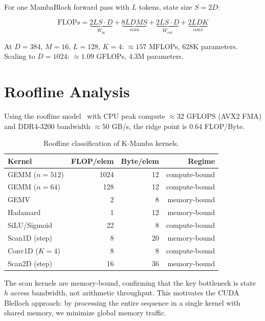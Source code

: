 \documentclass[10pt,twocolumn]{article}
\begin{document}
For one MambaBlock forward pass with $L$ tokens, state size $S = 2D$:

\begin{equation}
  \text{FLOPs} = \underbrace{2LS \cdot D}_{W_\text{in}}
               + \underbrace{8LDMS}_{scan}
               + \underbrace{2LS \cdot D}_{W_\text{out}}
               + \underbrace{2LDK}_{conv}
\end{equation}

At $D = 384$, $M = 16$, $L = 128$, $K = 4$: $\approx 157$ MFLOPs,
628K parameters. Scaling to $D = 1024$: $\approx 1.09$ GFLOPs, 4.3M parameters.

\section{Roofline Analysis}
\label{sec:roofline}

Using the roofline model~\cite{williams2009roofline} with
CPU peak compute $\approx 32$ GFLOPS (AVX2 FMA) and
DDR4-3200 bandwidth $\approx 50$ GB/s,
the ridge point is $0.64$ FLOP/Byte.

\begin{table}[h]
\centering
\caption{Roofline classification of K-Mamba kernels.}
\label{tab:roofline}
\begin{tabular}{lrrr}
\toprule
Kernel & FLOP/elem & Byte/elem & Regime \\
\midrule
GEMM ($n{=}512$) & 1024 & 12 & compute-bound \\
GEMM ($n{=}64$)  & 128  & 12 & compute-bound \\
GEMV             & 2    & 8  & memory-bound \\
Hadamard         & 1    & 12 & memory-bound \\
SiLU/Sigmoid     & 22   & 8  & compute-bound \\
Scan1D (step)    & 8    & 20 & memory-bound \\
Conv1D ($K{=}4$) & 8    & 8  & compute-bound \\
Scan2D (step)    & 16   & 36 & memory-bound \\
\bottomrule
\end{tabular}
\end{table}

The scan kernels are memory-bound, confirming that the key bottleneck
is state $h$ access bandwidth, not arithmetic throughput.
This motivates the CUDA Blelloch approach: by processing the entire
sequence in a single kernel with shared memory, we minimize global
memory traffic.
\end{document}
